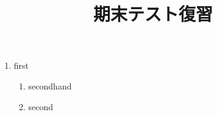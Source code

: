 \documentclass{jsarticle}
\begin{document}
\title{期末テスト復習}
\begin{enumerate}
  \item first
    \begin{enumerate}
      \item secondhand
      \item second
    \end{enumerate}
  \end{enumerate}
\end{document}
